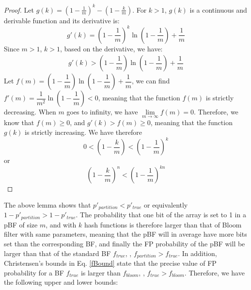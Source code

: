 \begin{proof}
Let $g(k)=( 1-\frac{1}{m} )  ^k- ( 1-\frac{k}{m} )$. For $k>1$, $g(k)$ is a continuous and derivable function and its derivative is:
\begin{equation}
g'(k)=\left( 1- \dfrac{1}{m}\right)^k \ln\left(1-\dfrac{1}{m}\right)+\dfrac{1}{m}
\end{equation}
Since $m > 1$, $k > 1$, based on the derivative, we have:
\begin{equation}
\begin{aligned}
g'(k) %
> \left( 1- \dfrac{1}{m}\right)\ln\left(1-\dfrac{1}{m}\right)+\dfrac{1}{m}
\end{aligned}
\end{equation}
Let $f(m)=\left( 1- \dfrac{1}{m}\right)\ln\left(1-\dfrac{1}{m}\right)+\dfrac{1}{m}$, we can find $f'(m) = \dfrac{1}{m^2} \ln\left(1-\dfrac{1}{m}\right)< 0$, meaning that the function $f(m)$ is strictly decreasing. When $m$ goes to infinity, we have $\lim\limits_{m \to \infty}  f(m) =  0$. Therefore, we know that $f(m) \geqslant 0$, and $g'(k) > f(m) \geqslant 0$, meaning that the function $g(k)$ is strictly increasing.
We have therefore 
\begin{equation}
0<\left( 1-\dfrac{k}{m} \right)   <
\left( 1-\dfrac{1}{m} \right)  ^k
\end{equation}
or 
\begin{equation}
\left( 1-\dfrac{k}{m} \right) ^n   <
\left( 1-\dfrac{1}{m} \right)  ^{kn}
\end{equation}
\end{proof}



The above lemma shows that $p'_{partition} < p'_{true}$ or equivalently $1-p'_{partition} > 1-p'_{true}$. The probability that one bit of the array is set to 1 in a pBF of size $m$, and with $k$ hash functions is therefore larger than that of Bloom filter with same parameters, meaning that the pBF will in average have more bits set than the corresponding BF, and finally the FP probability of the pBF will be larger than that of the standard BF  $f_{true}$, \ie, $f_{partition} > f_{true}$. In addition, Christensen’s bounds in Eq. \ref{fBound} state that the precise value of FP probability for a BF $f_{true}$ is larger than $f_{bloom}$, \ie, $f_{true} > f_{bloom}$. Therefore, we have the following upper and lower bounds:

